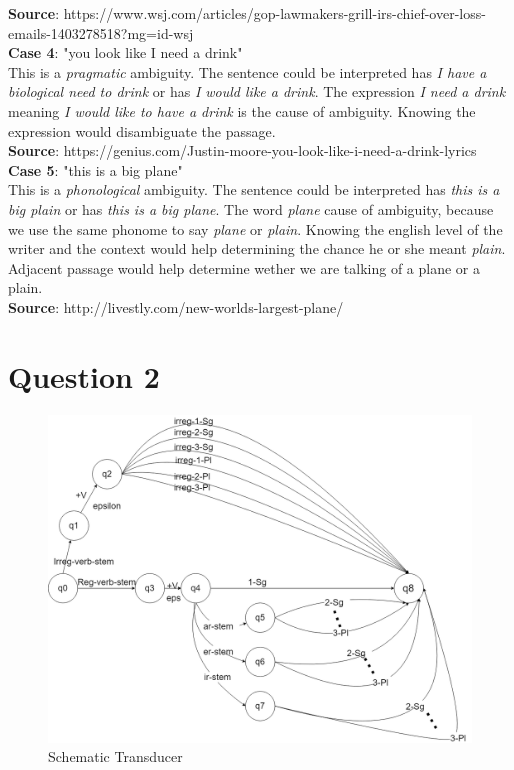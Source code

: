 \documentclass[10pt]{article}
\begin{document}
\textbf{Source}: https://www.wsj.com/articles/gop-lawmakers-grill-irs-chief-over-loss-emails-1403278518?mg=id-wsj\\

\textbf{Case 4}: "you look like I need a drink"\\

This is a \textit{pragmatic} ambiguity. The sentence could be interpreted has \textit{I have a biological need to drink} or has \textit{I would like a drink}. The expression \textit{I need a drink} meaning \textit{I would like to have a drink} is the cause of ambiguity. Knowing the expression would disambiguate the passage.\\

\textbf{Source}: https://genius.com/Justin-moore-you-look-like-i-need-a-drink-lyrics\\

\textbf{Case 5}: "this is a big plane"\\

This is a \textit{phonological} ambiguity. The sentence could be interpreted has \textit{this is a big plain} or has \textit{this is a big plane}. The word \textit{plane} cause of ambiguity, because we use the same phonome to say \textit{plane} or \textit{plain}. Knowing the english level of the writer and the context would help determining the chance he or she meant \textit{plain}. Adjacent passage would help determine wether we are talking of a plane or a plain.  \\

\textbf{Source}: http://livestly.com/new-worlds-largest-plane/\\

\section*{Question 2}
\begin{figure}[h!]
    \centering
    \includegraphics[scale=0.25]{schematic_transducer.png}
    \caption{Schematic Transducer}
    \label{fig:boat1}
\end{figure}
\end{document}
